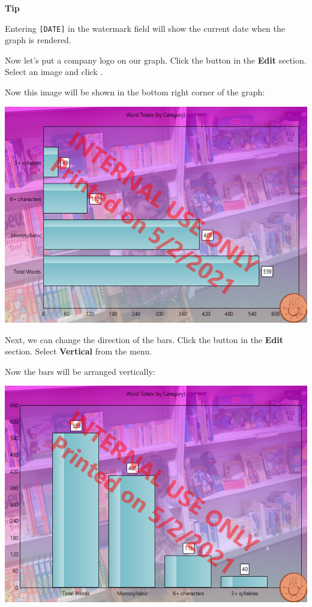\documentclass[
]{book}
\newenvironment{tipsection}
    {
    \begin{tcolorbox}[colframe=lightgray,colback=lightyellow,arc=3mm]
    \faLightbulb[regular] \textbf{Tip} \newline
    }
    {
    \end{tcolorbox}
    }
\theoremstyle{definition}
\theoremstyle{definition}
\theoremstyle{definition}
\theoremstyle{definition}
\theoremstyle{remark}
\begin{document}
\begin{tipsection}
Entering \texttt{{[}DATE{]}} in the watermark field will show the current date when the graph is rendered.

\end{tipsection}

Now let's put a company logo on our graph. Click the  button in the \textbf{Edit} section. Select an image and click .

Now this image will be shown in the bottom right corner of the graph:

\begin{center}\includegraphics[width=0.75\linewidth,]{Images/ExampleLogoChanged} \end{center}

Next, we can change the direction of the bars. Click the  button in the \textbf{Edit} section. Select \textbf{Vertical} from the menu.

Now the bars will be arranged vertically:

\begin{center}\includegraphics[width=0.75\linewidth,]{Images/ExampleBarChartOrientationChanged} \end{center}
\end{document}
